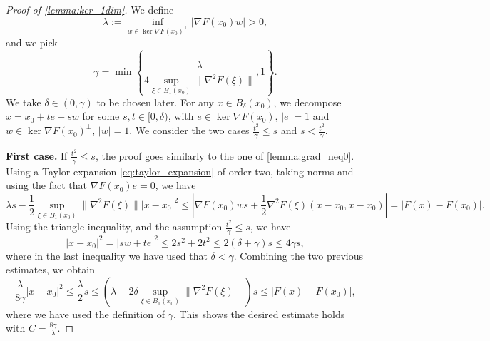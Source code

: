 \documentclass[10pt,a4paper]{amsart}
\begin{document}
\begin{proof}[Proof of \cref{lemma:ker_1dim}]
    We define
    \begin{equation}
        \lambda:=\inf_{w\in\ker\nabla F(x_0)^\perp}|\nabla F(x_0)w|>0,
    \end{equation}
    and we pick 
    $$
        \gamma=\min\left\{\frac{\lambda}{4\sup_{\xi\in B_1(x_0)}\|\nabla^2 F(\xi)\|},1\right\}.
    $$
    We take $\delta\in(0,\gamma)$ to be chosen later. For any $x\in B_\delta(x_0)$, we decompose $x=x_0+te+sw$ for some $s,t\in[0,\delta)$, with $e\in\ker\nabla F(x_0),\,|e|=1$ and $w\in\ker\nabla F(x_0)^\perp,\,|w|=1$.
    We consider the two cases $\frac{t^2}{\gamma}\leq s$ and $s<\frac{t^2}{\gamma}$.
    
    \textbf{First case.} If $\frac{t^2}{\gamma}\leq s$, the proof goes similarly to the one of \cref{lemma:grad_neq0}.
    Using a Taylor expansion \eqref{eq:taylor_expansion} of order two, taking norms and using the fact that $\nabla F(x_0)e=0$, we have
    \begin{equation*}
        \lambda s-\frac{1}{2}\sup_{\xi\in B_1(x_0)}\|\nabla^2 F(\xi)\| |x-x_0|^2\le\left|\nabla F(x_0)w s+\frac{1}{2}\nabla^2 F(\xi)(x-x_0,x-x_0)\right| = |F(x)-F(x_0)|.
    \end{equation*}
    Using the triangle inequality, and the assumption $\frac{t^2}{\gamma}\leq s$, we have
    \begin{equation*}
        |x-x_0|^2=|sw+te|^2\le 2s^2+2t^2\leq 2(\delta+\gamma) s\leq 4\gamma s,
    \end{equation*}
    where in the last inequality we have used that $\delta<\gamma$. Combining the two previous estimates, we obtain
    \begin{equation*}
        \frac{\lambda}{8\gamma} |x-x_0|^2\le\frac{\lambda}{2} s\le \left(\lambda-2\delta \sup_{\xi\in B_1(x_0)}\|\nabla^2 F(\xi)\|\right) s \le |F(x)-F(x_0)|,
    \end{equation*}
    where we have used the definition of $\gamma$. This shows the desired estimate holds with $C=\frac{8\gamma}{\lambda}$.
    

\end{proof}
\end{document}
